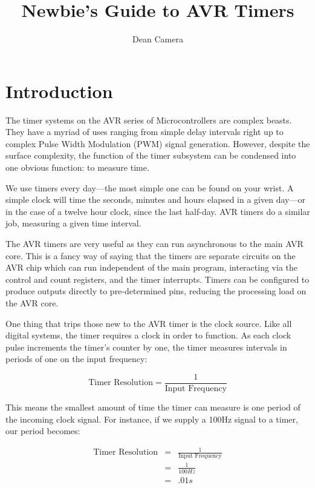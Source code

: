 \documentclass[a4paper,oneside,notitlepage]{book}
\begin{document}
\title{Newbie's Guide to AVR Timers}
\author{Dean Camera}

\maketitle

\tableofcontents
\cleardoublepage


\label{chp:Intro}
\chapter{Introduction}
The timer systems on the AVR series of Microcontrollers are complex beasts. They have a myriad of uses ranging from simple delay intervals right up to complex Pulse Width Modulation (PWM) signal generation. However, despite the surface complexity, the function of the timer subsystem can be condensed into one obvious function: to measure time.

We use timers every day---the most simple one can be found on your wrist. A simple clock will time the seconds, minutes and hours elapsed in a given day---or in the case of a twelve hour clock, since the last half-day. AVR timers do a similar job, measuring a given time interval.

The AVR timers are very useful as they can run asynchronous to the main AVR core. This is a fancy way of saying that the timers are separate circuits on the AVR chip which can run independent of the main program, interacting via the control and count registers, and the timer interrupts. Timers can be configured to produce outputs directly to pre-determined pins, reducing the processing load on the AVR core.

One thing that trips those new to the AVR timer is the clock source. Like all digital systems, the timer requires a clock in order to function. As each clock pulse increments the timer's counter by one, the timer measures intervals in periods of one on the input frequency:

\begin{displaymath}
	\text{Timer Resolution} = \frac{1}{\text{Input Frequency}}
\end{displaymath}

This means the smallest amount of time the timer can measure is one period of the incoming clock signal. For instance, if we supply a 100Hz signal to a timer, our period becomes:

\begin{displaymath}
\begin{array}{rcl}
	\text{Timer Resolution} & = & \frac{1}{\text{Input Frequency}} \\
	                        & = & \frac{1}{100 Hz} \\
	                        & = & .01s
\end{array}
\end{displaymath}
\end{document}
